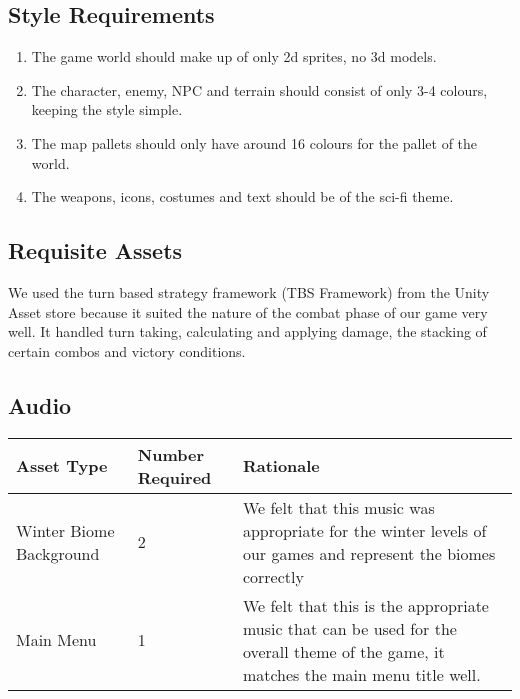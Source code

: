 \documentclass{article}
\begin{document}
\subsection{Style Requirements}
\begin{enumerate}[{SR}1. ]
	\item The game world should make up of only 2d sprites, no 3d models.
	\item The character, enemy, NPC and terrain should consist of only 3-4 colours, keeping the style simple.
	\item The map pallets should only have around 16 colours for the pallet of the world.
	\item The weapons, icons, costumes and text should be of the sci-fi theme.
\end{enumerate}
\subsection{Requisite Assets}
\quad We used the turn based strategy framework (TBS Framework) from the Unity Asset store because it suited the nature of the combat phase of our game very well. It handled turn taking, calculating and applying damage, the stacking of certain combos and victory conditions.
\subsection{Audio}
\begin{center}
\begin{tabular}{ | m{5cm} | m{5cm}|m{5cm}|} 
\hline
Asset Type & Number Required & Rationale\\ 
\hline
Winter Biome Background & 2 & We felt that this music was appropriate for the winter levels of our games and represent the biomes correctly\\
\hline
Main Menu & 1 & We felt that this is the appropriate music that can be used for the overall theme of the game, it matches the main menu title well.\\
\hline
\end{tabular}
\end{center}
\end{document}
